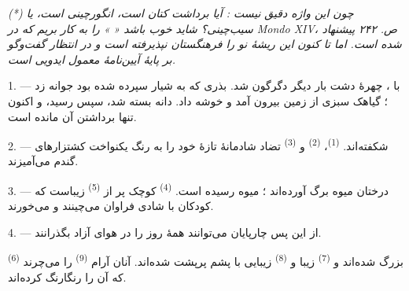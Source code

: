 %

\textit{(*) چون این واژه دقیق نیست : آیا برداشت کتان است، انگورچینی است،
یا سیب‌چینی؟ شاید خوب باشد «}  \textit{» را به کار
بریم که در Mondo XIV، ص. ۲۴۲ پیشنهاد شده است. اما تا کنون این ریشهٔ نو
را فرهنگستان نپذیرفته است و در انتظار گفت‌وگو بر پایهٔ آیین‌نامهٔ
معمول ایدویی است.}

\VUsaut{5.0mm}
\VUsaut{3.0mm}
\VUsaut{3.0mm}
\VUsaut{4.0mm}
\VUsaut{3.0mm}

1. --- با ، چهرهٔ دشت بار دیگر دگرگون شد. بذری که به
شیار سپرده شده بود جوانه زد ؛ گیاهک سبزی از زمین بیرون آمد و خوشه داد.
دانه بسته شد، سپس رسید، و اکنون تنها برداشتن آن مانده است.

2. ---  شکفته‌اند. 
\textsuperscript{(1)}،  \textsuperscript{(2)} و
 \textsuperscript{(3)} تضاد شادمانهٔ 
تازهٔ خود را به رنگ یکنواخت کشتزارهای گندم می‌آمیزند.

3. --- درختان میوه برگ آورده‌اند ؛ میوه رسیده است. 
\textsuperscript{(4)} کوچک پر از  \textsuperscript{(5)}
زیباست که کودکان با شادی فراوان می‌چینند و می‌خورند.

4. --- از این پس چارپایان می‌توانند همهٔ روز را در هوای آزاد بگذرانند.

 \textsuperscript{(6)} بزرگ شده‌اند و 
\textsuperscript{(7)} زیبا و  \textsuperscript{(8)}
زیبایی با پشم پرپشت شده‌اند. آنان آرام  
\textsuperscript{(9)} را می‌چرند که  آن را
رنگارنگ کرده‌اند.


